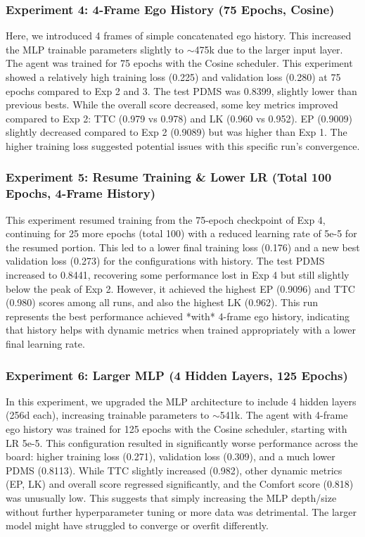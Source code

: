 \documentclass{article}
\begin{document}
\subsubsection*{Experiment 4: 4-Frame Ego History (75 Epochs, Cosine)}
Here, we introduced 4 frames of simple concatenated ego history. This increased the MLP trainable parameters slightly to $\sim$475k due to the larger input layer. The agent was trained for 75 epochs with the Cosine scheduler. This experiment showed a relatively high training loss (0.225) and validation loss (0.280) at 75 epochs compared to Exp 2 and 3. The test PDMS was 0.8399, slightly lower than previous bests. While the overall score decreased, some key metrics improved compared to Exp 2: TTC (0.979 vs 0.978) and LK (0.960 vs 0.952). EP (0.9009) slightly decreased compared to Exp 2 (0.9089) but was higher than Exp 1. The higher training loss suggested potential issues with this specific run's convergence.
\subsubsection*{Experiment 5: Resume Training & Lower LR (Total 100 Epochs, 4-Frame History)}
This experiment resumed training from the 75-epoch checkpoint of Exp 4, continuing for 25 more epochs (total 100) with a reduced learning rate of 5e-5 for the resumed portion. This led to a lower final training loss (0.176) and a new best validation loss (0.273) for the configurations with history. The test PDMS increased to 0.8441, recovering some performance lost in Exp 4 but still slightly below the peak of Exp 2. However, it achieved the highest EP (0.9096) and TTC (0.980) scores among all runs, and also the highest LK (0.962). This run represents the best performance achieved *with* 4-frame ego history, indicating that history helps with dynamic metrics when trained appropriately with a lower final learning rate.
\subsubsection*{Experiment 6: Larger MLP (4 Hidden Layers, 125 Epochs)}
In this experiment, we upgraded the MLP architecture to include 4 hidden layers (256d each), increasing trainable parameters to $\sim$541k. The agent with 4-frame ego history was trained for 125 epochs with the Cosine scheduler, starting with LR 5e-5. This configuration resulted in significantly worse performance across the board: higher training loss (0.271), validation loss (0.309), and a much lower PDMS (0.8113). While TTC slightly increased (0.982), other dynamic metrics (EP, LK) and overall score regressed significantly, and the Comfort score (0.818) was unusually low. This suggests that simply increasing the MLP depth/size without further hyperparameter tuning or more data was detrimental. The larger model might have struggled to converge or overfit differently.
\end{document}
